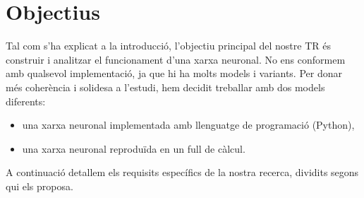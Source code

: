 \chapter{Objectius}
\label{c:objectius}

Tal com s’ha explicat a la introducció, l’objectiu principal del nostre TR és construir i analitzar el funcionament d’una xarxa neuronal. No ens conformem amb qualsevol implementació, ja que hi ha molts models i variants. Per donar més coherència i solidesa a l’estudi, hem decidit treballar amb dos models diferents:
\begin{itemize}
\item una xarxa neuronal implementada amb llenguatge de programació (Python),
\item una xarxa neuronal reproduïda en un full de càlcul.
\end{itemize}

A continuació detallem els requisits específics de la nostra recerca, dividits segons qui els proposa.

